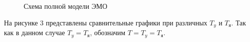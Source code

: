 \documentclass[a4paper, 11pt]{article}
\begin{document}
\begin{figure}[h]
	\caption{Схема полной модели ЭМО}
	\label{ris:image}
\end{figure}
\par 
На рисунке 3 представлены сравнительные графики при различных $T_y$ и $T_\text{я}$. Так как в данном случае $T_y=T_\text{я}$, обозначим $T = T_y = T_\text{я}$.
\end{document}
